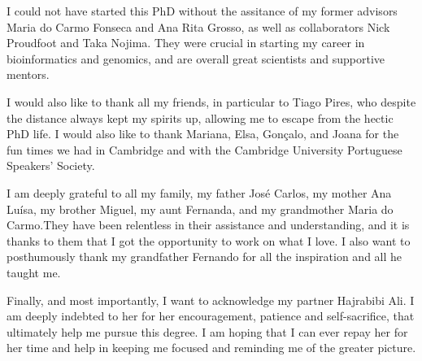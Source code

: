 \begin{acknowledgements}
I could not have started this PhD without the assitance of my former advisors Maria do Carmo Fonseca and Ana Rita Grosso, as well as collaborators Nick Proudfoot and Taka Nojima. They were crucial in starting my career in bioinformatics and genomics, and are overall great scientists and supportive mentors.

I would also like to thank all my friends, in particular to Tiago Pires, who despite the distance always kept my spirits up, allowing me to escape from the hectic PhD life. I would also like to thank Mariana, Elsa, Gonçalo, and Joana for the fun times we had in Cambridge and with the Cambridge University Portuguese Speakers' Society.

I am deeply grateful to all my family, my father José Carlos, my mother Ana Luísa, my brother Miguel, my aunt Fernanda, and my grandmother Maria do Carmo.They have been relentless in their assistance and understanding, and it is thanks to them that I got the opportunity to work on what I love. I also want to posthumously thank my grandfather Fernando for all the inspiration and all he taught me.

Finally, and most importantly, I want to acknowledge my partner Hajrabibi Ali. I am deeply indebted to her for her encouragement, patience and self-sacrifice, that ultimately help me pursue this degree. I am hoping that I can ever repay her for her time and help in keeping me focused and reminding me of the greater picture.

\end{acknowledgements}
